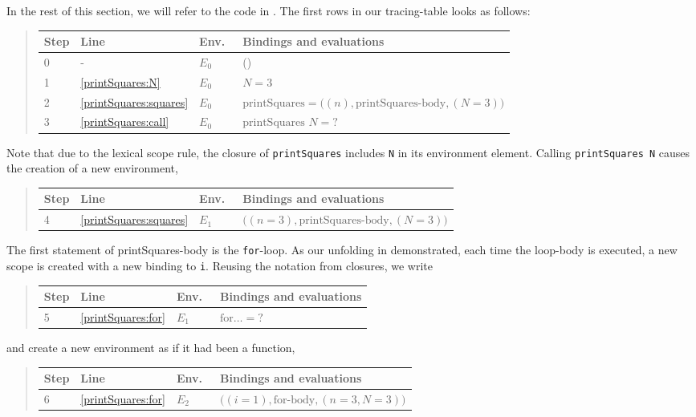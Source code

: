 \documentclass[fsharpNotes.tex]{subfiles}
\begin{document}
In the rest of this section, we will refer to the code in . The first rows in our tracing-table looks as follows:
\begin{quote}
  \begin{tabular*}{0.9\linewidth}{l|lll}
    Step & Line & Env.\ & Bindings and evaluations\\
    \hline
    0 & - & $E_0$ & ()\\
    1 &\ref{printSquares:N} & $E_0$ & $N = 3$\\
    2 &\ref{printSquares:squares} & $E_0$ & $\text{printSquares} = \big((n), \text{printSquares-body}, (N=3)\big)$\\
    3 &\ref{printSquares:call} & $E_0$ & $\text{printSquares } N = \text{?}$\\
  \end{tabular*}
\end{quote}
Note that due to the lexical scope rule, the closure of \lstinline{printSquares} includes \lstinline{N} in its environment element. Calling \lstinline{printSquares N} causes the creation of a new environment,
\begin{quote}
  \begin{tabular*}{0.9\linewidth}{l|lll}
    Step & Line & Env.\ & Bindings and evaluations\\
    \hline
    4 &\ref{printSquares:squares} & $E_1$ & $\big((n=3), \text{printSquares-body}, (N=3)\big)$\\
    \end{tabular*}
\end{quote}
The first statement of printSquares-body is the \lstinline{for}-loop. As our unfolding in  demonstrated, each time the loop-body is executed, a new scope is created with a new binding to \lstinline{i}. Reusing the notation from closures, we write
\begin{quote}
  \begin{tabular*}{0.9\linewidth}{l|lll}
    Step & Line & Env.\ & Bindings and evaluations\\
    \hline
    5 &\ref{printSquares:for} & $E_1$ & $\text{for} \dots =\text{?}$\\
  \end{tabular*}
\end{quote}
and create a new environment as if it had been a function,
\begin{quote}
  \begin{tabular*}{0.9\linewidth}{l|lll}
    Step & Line & Env.\ & Bindings and evaluations\\
    \hline
    6 &\ref{printSquares:for} & $E_2$ & $\big((i=1), \text{for-body}, (n=3,N=3)\big)$\\
    \end{tabular*}
\end{quote}
\end{document}
